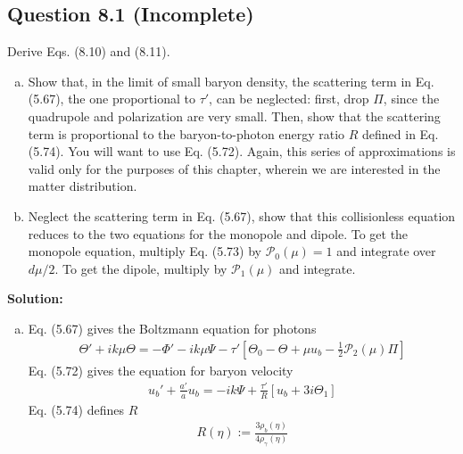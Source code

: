 \documentclass[11pt]{article}
\begin{document}
\subsection{Question 8.1 (Incomplete)}
Derive Eqs. (8.10) and (8.11). 
\begin{enumerate} [(a)]
    \item Show that, in the limit of small baryon density, the scattering term in Eq. (5.67), the one proportional to $\tau'$, can be neglected: first, drop $\Pi$, since the quadrupole and polarization are very small. Then, show that the scattering term is proportional to the baryon-to-photon energy ratio $R$ defined in Eq. (5.74). You will want to use Eq. (5.72). Again, this series of approximations is valid only for the purposes of this chapter, wherein we are interested in the matter distribution. 
    \item Neglect the scattering term in Eq. (5.67), show that this collisionless equation reduces to the two equations for the monopole and dipole. To get the monopole equation, multiply Eq. (5.73) by $\mathcal{P}_0(\mu) = 1$ and integrate over $d\mu/2$. To get the dipole, multiply by $\mathcal{P}_1(\mu)$ and integrate. 
\end{enumerate}

\textbf{Solution:}
\begin{enumerate} [(a)]
    \item Eq. (5.67) gives the Boltzmann equation for photons 
    \begin{align*}
        \Theta' + ik\mu \Theta = - \Phi' - ik\mu \Psi - \tau' \left[ \Theta_0 - \Theta + \mu u_b - \frac{1}{2}\mathcal{P}_2(\mu) \Pi\right] 
    \end{align*}
    Eq. (5.72) gives the equation for baryon velocity 
    \begin{align*}
        u_b' + \frac{a'}{a}u_b = -ik\Psi  + \frac{\tau'}{R}[u_b + 3i\Theta_1]
    \end{align*}
    Eq. (5.74) defines $R$ 
    \begin{align*}
        R(\eta) := \frac{3\rho_b(\eta)}{4\rho_\gamma(\eta)}
    \end{align*}
\end{enumerate}
\end{document}
